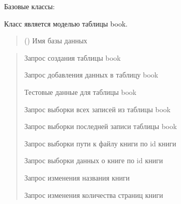 \documentclass[letterpaper,10pt,russian]{sphinxmanual}
\begin{document}
\begin{fulllineitems}
\label{\detokenize{database.sqlite3_interface.tables:database.sqlite3_interface.tables.book.Book}}
\pysigstartsignatures
{}
\pysigstopsignatures
\sphinxAtStartPar
Базовые классы: {\hyperref[\detokenize{database.sqlite3_interface.tables:database.sqlite3_interface.tables.table.Table}]{}}

\sphinxAtStartPar
Класс является моделью таблицы book.
\begin{quote}\begin{description}
\sphinxAtStartPar
{} () \textendash{} Имя базы данных

\end{description}\end{quote}
\begin{description}
\begin{quote}\begin{description}
\sphinxAtStartPar
Запрос создания таблицы book

\sphinxAtStartPar
Запрос добавления данных в таблицу book

\sphinxAtStartPar
Тестовые данные для таблицы book

\sphinxAtStartPar
Запрос выборки всех записей из таблицы book

\sphinxAtStartPar
Запрос выборки последней записи таблицы book

\sphinxAtStartPar
Запрос выборки пути к файлу книги по id книги

\sphinxAtStartPar
Запрос выборки данных о книге по id книги

\sphinxAtStartPar
Запрос изменения названия книги

\sphinxAtStartPar
Запрос изменения количества страниц книги


\end{description}
\end{quote}
\end{description}
\end{fulllineitems}
\end{document}
